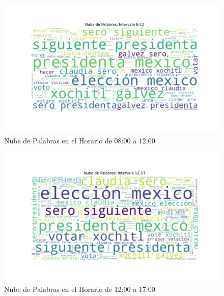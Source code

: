 \documentclass[10pt, a4paper]{article}
\begin{document}
	\vspace{-5mm}
	\begin{figure}[h!]
		\centering
		\includegraphics[width=1\textwidth]{nube_intervalo_8-12.pdf} %
		\vspace{-22mm}
		\caption{Nube de Palabras en el Horario de 08:00 a 12:00}
		\label{fig:nubeIntervalo812} %
	\end{figure}
	
	\newpage
	\vspace{-10mm}
	\begin{figure}[h!]
		\centering
		\includegraphics[width=1\textwidth]{nube_intervalo_12-17.pdf} %
		\vspace{-22mm}
		\caption{Nube de Palabras en el Horario de 12:00 a 17:00}
		\label{fig:nubeIntervalo1217} %
	\end{figure}
	
\end{document}
